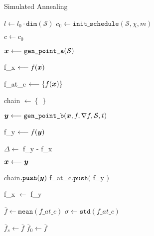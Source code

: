 \begin{algorithm}
\caption{Simulated Annealing}\label{algo:sa}
\vspace{8pt}
\nosemic
\SetAlgoLined
{}

$l \longleftarrow l_0 \cdot \texttt{dim}(\mathcal{S}) $ \;
$c_0 \longleftarrow \texttt{init\_schedule}(\mathcal{S}, \chi, m) $ \;

$c  \longleftarrow c_0$ \;

$\boldsymbol{x} \longleftarrow \texttt{gen\_point\_a}(\mathcal{S})$ \;

f\_x $\longleftarrow f(\boldsymbol{x})$ \;

{
    f\_at\_c $\longleftarrow \left\lbrace f(\boldsymbol{x}) \right\rbrace$ \;

    chain $\longleftarrow \left\lbrace \: \right\rbrace$ \;

     {

        $\boldsymbol{y} \longleftarrow \texttt{gen\_point\_b}(\boldsymbol{x}, f, \nabla f,\mathcal{S}, t )  $ \;

        f\_y $\longleftarrow f(\boldsymbol{y})$ \;

        $\Delta \longleftarrow $ f\_y - f\_x \;

        \If{ $\Delta \leq 0$ or $\exp\left( -\Delta /c \right) > \texttt{random}[0,1) $ }
        {
            $\boldsymbol{x} \longleftarrow \boldsymbol{y} $ 

            chain$.\texttt{push}(\boldsymbol{y})$ \;
            f\_at\_c$.\texttt{push}($ f\_y $)$\;

            f\_x $\longleftarrow$ f\_y \;


        }


    }

    $\overline{f} \longleftarrow \texttt{mean}(f\_at\_c)$ \;
    $\sigma \longleftarrow \texttt{std}(f\_at\_c)$ \;


     {
        $\overline{f}_s \longleftarrow \overline{f}$ \;
        $\overline{f}_0 \longleftarrow \overline{f}$ \;

    } 

}
\end{algorithm}
